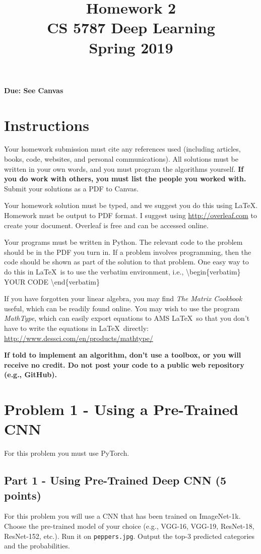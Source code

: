 \documentclass[11pt, oneside]{article}   	%
\title{Homework 2 \\ CS 5787 Deep Learning \\ Spring 2019}
\date{}
\begin{document}
\maketitle

\textbf{Due: See Canvas}

\section*{Instructions}

Your homework submission must cite any references used (including articles, books, code, websites, and personal communications).  All solutions must be written in your own words, and you must program the algorithms yourself. \textbf{If you do work with others, you must list the people you worked with.} Submit your solutions as a PDF to Canvas.

Your homework solution must be typed, and we suggest you do this using \LaTeX. Homework must be output to PDF format. I suggest using \url{http://overleaf.com}  to create your document. Overleaf is free and can be accessed online.

Your programs must be written in  Python. The relevant code to the problem should be in the PDF you turn in. If a problem involves programming, then the code should be shown as part of the solution to that problem. One easy way to do this in \LaTeX \, is to use the verbatim environment, i.e., \textbackslash begin\{verbatim\} YOUR CODE \textbackslash end\{verbatim\}

If you have forgotten your linear algebra, you may find  \textit{The Matrix Cookbook} useful, which can be readily found online. You may wish to use the program \textit{MathType}, which can easily export equations to AMS \LaTeX \, so that you don't have to write the equations in \LaTeX \, directly: \url{http://www.dessci.com/en/products/mathtype/}

\sloppy
\textbf{If told to implement an algorithm, don't use a toolbox, or you will receive no credit. Do not post your code to a public web repository (e.g., GitHub).}


\section*{Problem 1 - Using a Pre-Trained CNN}
For this problem you must use PyTorch.


\subsection*{Part 1 - Using Pre-Trained Deep CNN (5 points)}
For this problem you will use a CNN that has been trained on ImageNet-1k. Choose the pre-trained model of your choice (e.g., VGG-16, VGG-19, ResNet-18, ResNet-152, etc.). Run it on \texttt{peppers.jpg}. Output the top-3 predicted categories and the probabilities.
\end{document}
